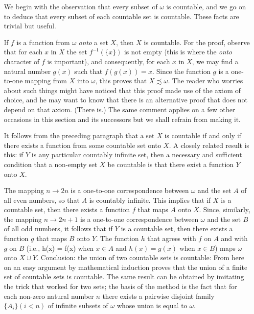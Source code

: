 We begin with the observation that every subset of $\omega$ is countable, and we go on to deduce that every subset of each countable set is countable. These facts are trivial but useful.

If $f$ is a function from $\omega$ \textit{onto} a set $X$, then $X$ is countable. For the proof, observe that for each $x$ in $X$ the set $f^{-1}(\{ x \})$ is not empty (this is where the \textit{onto} character of $f$ is important), and consequently, for each $x$ in $X$, we may find a natural number $g(x)$ such that $f(g(x)) = x$. Since the function $g$ is a one-to-one mapping from $X$ into $\omega$, this proves that $X \precsim \omega$. The reader who worries about such things might have noticed that this proof made use of the axiom of choice, and he may want to know that there is an alternative proof that does not depend on that axiom. (There is.) The same comment applies on a few other occasions in this section and its successors but we shall refrain from making it.

It follows from the preceding paragraph that a set $X$ is countable if and only if there exists a function from some countable set onto $X$. A closely related result is this: if $Y$ is any particular countably infinite set, then a necessary and sufficient condition that a non-empty set $X$ be countable is that there exist a function $Y$ onto $X$.

The mapping $n \rightarrow 2n$ is a one-to-one correspondence between $\omega$ and the set $A$ of all even numbers, so that $A$ is countably infinite. This implies that if $X$ is a countable set, then there exists a function $f$ that maps $A$ onto $X$. Since, similarly, the mapping $n \rightarrow 2n + 1$ is a one-to-one correspondence between $\omega$ and the set $B$ of all odd numbers, it follows that if $Y$ is a countable set, then there exists a function $g$ that maps $B$ onto $Y$. The function $h$ that agrees with $f$ on $A$ and with $g$ on $B$ (i.e., h(x) = f(x) when $x \in A$ and $h(x) = g(x)$ when $x \in B$) maps $\omega$ onto $X \cup Y$. Conclusion: the union of two countable sets is countable: From here on an easy argument by mathematical induction proves that the union of a finite set of countable sets is countable. The same result can be obtained by imitating the trick that worked for two sets; the basis of the method is the fact that for each non-zero natural number $n$ there exists a pairwise disjoint family $\{ A_{i} \} (i < n)$ of infinite subsets of $\omega$ whose union is equal to $\omega$.

